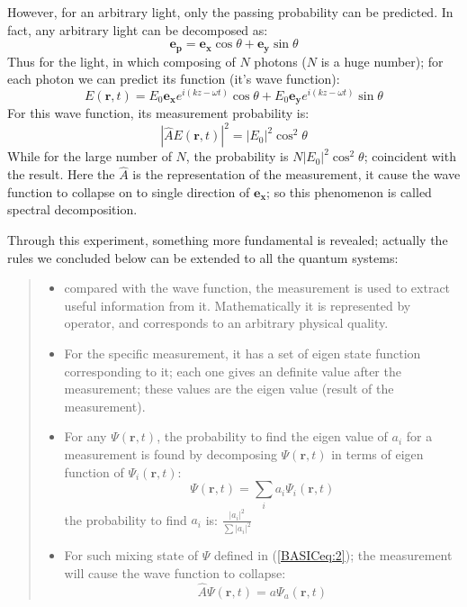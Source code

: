 However, for an arbitrary light, only the passing probability can be
predicted. In fact, any arbitrary light can be decomposed as:
\begin{equation}\label{}
\bm{e_{p}} = \bm{e_{x}}\cos\theta+ \bm{e_{y}}\sin\theta
\end{equation}
Thus for the light, in which composing of $N$ photons ($N$ is a huge
number); for each photon we can predict its function (it's wave
function):
\begin{equation}\label{}
E(\bm{r},t) = E_{0}\bm{e_{x}}e^{i(kz-\omega t )}\cos\theta +
E_{0}\bm{e_{y}}e^{i(kz-\omega t )}\sin\theta
\end{equation}
For this wave function, its measurement probability is:
\begin{equation}\label{}
|\hat{A}E(\bm{r},t)|^{2} = |E_{0}|^{2}\cos^{2}\theta
\end{equation}
While for the large number of $N$, the probability is
$N|E_{0}|^{2}\cos^{2}\theta$; coincident with the result. Here the
$\hat{A}$ is the representation of the measurement, it cause the
wave function to collapse on to single direction of $\bm{e_{x}}$; so
this phenomenon is called spectral decomposition.

Through this experiment, something more fundamental is revealed;
actually the rules we concluded below can be extended to all the
quantum systems:
\begin{center}
\begin{quote}
\begin{itemize}
  \item compared with the wave function,  the measurement is used to
  extract useful information from it. Mathematically it is
  represented by operator, and corresponds to an arbitrary physical
  quality.
  \item For the specific measurement, it has a set of eigen state
  function corresponding to it; each one gives an definite value
  after the measurement; these values are the eigen value (result of the
  measurement).
  \item For any $\Psi(\bm{r},t)$, the probability to find the eigen value
  of $a_{i}$ for a measurement is found by decomposing $\Psi(\bm{r},t)$
  in  terms of eigen function of $\Psi_{i}(\bm{r},t)$:
  \begin{equation}\label{BASICeq:2}
  \Psi(\bm{r},t) = \sum_{i}a_{i}\Psi_{i}(\bm{r},t)
  \end{equation}
  the probability to find $a_{i}$ is: $\frac{|a_{i}|^{2}}{\sum|a_{i}|^{2}}$
  \item For such mixing state of $\Psi$ defined in
  (\ref{BASICeq:2}); the measurement will cause the wave function to
  collapse:
  \begin{equation}\label{}
  \hat{A}\Psi(\bm{r},t) = a \Psi_{a}(\bm{r},t)
  \end{equation}
\end{itemize}
\end{quote}
\end{center}


